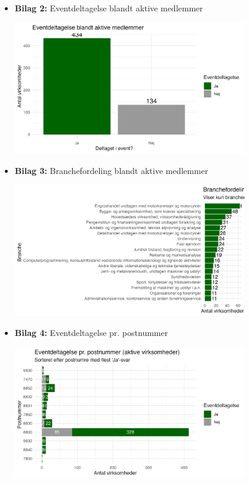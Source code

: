 \documentclass[
  11pt,
  letterpaper,
  DIV=11,
  numbers=noendperiod]{scrartcl}
\begin{document}
\begin{itemize}
\item
  \textbf{Bilag 2:} Eventdeltagelse blandt aktive medlemmer
  \begin{center}
  \includegraphics[width=0.8\textwidth,height=\textheight]{images/EDA_2_eventdeltagelse.png}
  \end{center}
\item
  \textbf{Bilag 3:} Branchefordeling blandt aktive medlemmer
  \begin{center}
  \includegraphics[width=0.8\textwidth,height=\textheight]{images/EDA_4_branchefordeling.png}
  \end{center}
\item
  \textbf{Bilag 4:} Eventdeltagelse pr. postnummer \begin{center}
  \includegraphics[width=0.8\textwidth,height=\textheight]{images/EDA_5_eventdeltagelse_postnummer.png}

\end{center}
\end{itemize}
\end{document}
